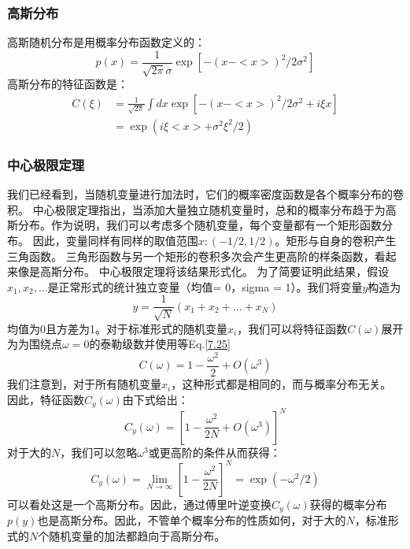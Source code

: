 \documentclass[12pt, UTF8]{ctexart}%
\numberwithin{equation}{section}
\numberwithin{figure}{section}
\newcommand{\InsertEqution}[2]{\begin{equation}
  \label{#1}
   #2
 \end{equation}}
\newcommand{\RefEq}[1]{Eq.\ref{#1}}
\newcommand{\InsertInlineEq}[1]{$#1$}
\begin{document}
\begin{sloppypar}
\subsubsection{高斯分布}
高斯随机分布是用概率分布函数定义的：
\InsertEqution{7.31}{p(x)=\frac{1}{\sqrt{2 \pi} \sigma} \exp \left[-(x-<x>)^{2} / 2 \sigma^{2}\right]}
高斯分布的特征函数是：
\InsertEqution{7.32}{\begin{aligned}
  C(\xi) &=\frac{1}{\sqrt{2 \pi}} \int d x \exp \left[-(x-<x>)^{2} / 2 \sigma^{2}+i \xi x\right] \\
  &=\exp \left(i \xi<x>+\sigma^{2} \xi^{2} / 2\right)
  \end{aligned}}
\subsubsection{中心极限定理}
我们已经看到，当随机变量进行加法时，它们的概率密度函数是各个概率分布的卷积。 中心极限定理指出，当添加大量独立随机变量时，总和的概率分布趋于为高斯分布。作为说明，我们可以考虑多个随机变量，每个变量都有一个矩形函数分布。 因此，变量同样有同样的取值范围\InsertInlineEq{x:(-1/2,1/2)}。矩形与自身的卷积产生三角函数。 三角形函数与另一个矩形的卷积多次会产生更高阶的样条函数，看起来像是高斯分布。 中心极限定理将该结果形式化。 为了简要证明此结果，假设\InsertInlineEq{x_1,x_2,...}是正常形式的统计独立变量（均值= 0，sigma = 1）。我们将变量\InsertInlineEq{y}构造为
\InsertEqution{7.33}{y=\frac{1}{\sqrt{N}}\left(x_{1}+x_{2}+\ldots+x_{N}\right)}
均值为0且方差为1。对于标准形式的随机变量\InsertInlineEq{x_i}，我们可以将特征函数\InsertInlineEq{C(\omega)}展开为为围绕点\InsertInlineEq{\omega=0}的泰勒级数并使用等\RefEq{7.25}
\InsertEqution{7.34}{C(\omega)=1-\frac{\omega^{2}}{2}+O\left(\omega^{3}\right)}
我们注意到，对于所有随机变量\InsertInlineEq{x_i}，这种形式都是相同的，而与概率分布无关。 因此，特征函数\InsertInlineEq{C_y (\omega)}由下式给出：
\InsertEqution{7.35}{C_{y}(\omega)=\left[1-\frac{\omega^{2}}{2 N}+O\left(\omega^{3}\right)\right]^{N}}
对于大的\InsertInlineEq{N}，我们可以忽略\InsertInlineEq{\omega^3}或更高阶的条件从而获得：
\InsertEqution{7.36}{C_{y}(\omega)=\lim _{N \rightarrow \infty}\left[1-\frac{\omega^{2}}{2 N}\right]^{N}=\exp \left(-\omega^{2} / 2\right)}
可以看处这是一个高斯分布。因此，通过傅里叶逆变换\InsertInlineEq{C_y(\omega)}获得的概率分布\InsertInlineEq{p(y)}也是高斯分布。因此，不管单个概率分布的性质如何，对于大的\InsertInlineEq{N}，标准形式的\InsertInlineEq{N}个随机变量的加法都趋向于高斯分布。

\end{sloppypar}
\end{document}
